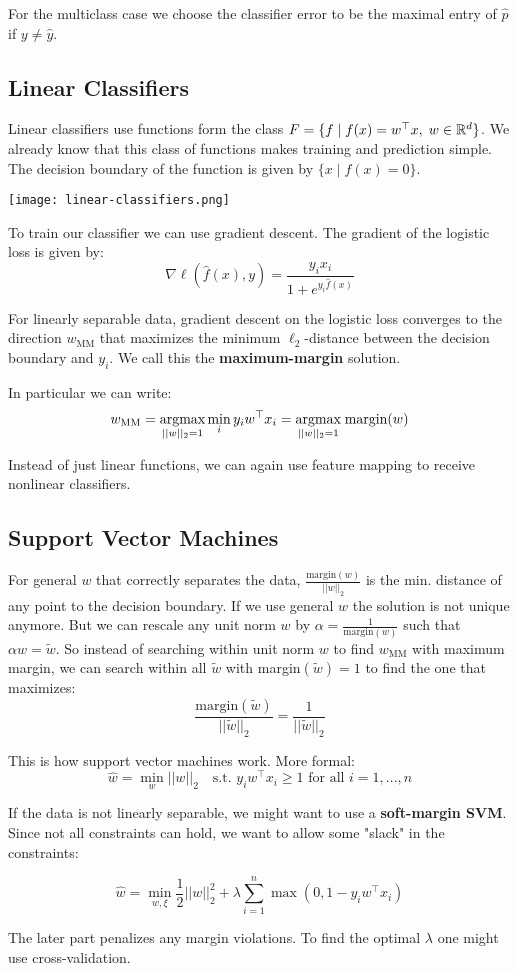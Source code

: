 For the multiclass case we choose the classifier error to be the maximal entry of $\hat{p}$ if $y \neq \hat{y}$.

\subsection{Linear Classifiers}

Linear classifiers use functions form the class $F = \{ f \; | \; f(x) = w^\top x, \; w \in \mathbb{R}^d\}$. We already know that this class of functions makes training and prediction simple. The decision boundary of the function is given by $\{ x \; | \; f(x) = 0\}$.

\begin{center}
	\texttt{[image: linear-classifiers.png]}
\end{center}

To train our classifier we can use gradient descent. The gradient of the logistic loss is given by:
$$\nabla \ell(\hat{f}(x), y) = \frac{y_i x_i}{1 + e^{y_i \hat{f}(x)}}$$
 
 For linearly separable data, gradient descent on the logistic loss converges to the direction $w_\text{MM}$ that maximizes the minimum $\ell_2$-distance between the decision boundary and $y_i$. We call this the \textbf{maximum-margin} solution.
 
 In particular we can write:
 $$w_\text{MM} = \underset{||w||_2 = 1}{\text{argmax}} \min_i y_i w^\top x_i = \underset{||w||_2 = 1}{\text{argmax}} \; \text{margin} (w)$$
 
 Instead of just linear functions, we can again use feature mapping to receive nonlinear classifiers.
 
 \subsection{Support Vector Machines}
 
 For general $w$ that correctly separates the data, $\frac{\text{margin}(w)}{||w||_2}$ is the min. distance of any point to the decision boundary. If we use general $w$ the solution is not unique anymore. But we can rescale any unit norm $w$ by $\alpha = \frac{1}{\text{margin}(w)}$ such that $\alpha w = \tilde{w}$. So instead of searching within unit norm $w$ to find $w_\text{MM}$ with maximum margin, we can search within all $\tilde{w}$ with margin$(\tilde{w}) = 1$ to find the one that maximizes:
 $$\frac{\text{margin}(\tilde{w})}{||\tilde{w}||_2} = \frac{1}{||\tilde{w}||_2}$$ 
 
 This is how support vector machines work. More formal:
 $$\hat{w} = \min_w ||w||_2 \quad \text{s.t. } y_i w^\top x_i \geq 1 \text{ for all } i=1,...,n$$
 
 If the data is not linearly separable, we might want to use a \textbf{soft-margin SVM}. Since not all constraints can hold, we want to allow some "slack" in the constraints:
 
  $$\hat{w} = \min_{w, \xi} \frac{1}{2} ||w||_2^2 + \lambda \sum_{i=1}^n \max (0, 1 - y_i w^\top x_i)$$
  
  The later part penalizes any margin violations. To find the optimal $\lambda$ one might use cross-validation.
  
